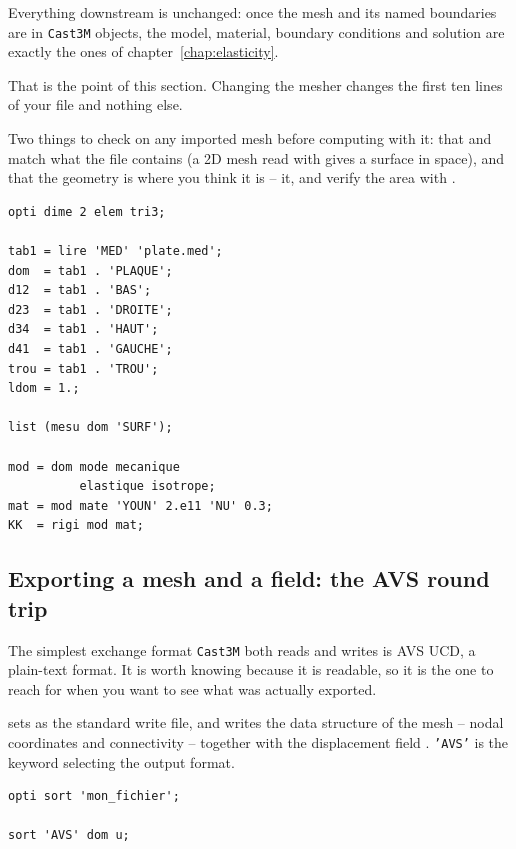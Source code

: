 \begin{castemcom}
Everything downstream is unchanged: once the mesh and its named boundaries
are in \texttt{Cast3M} objects, the model, material, boundary conditions and
solution are exactly the ones of chapter~\ref{chap:elasticity}.

That is the point of this section. Changing the mesher changes the first ten
lines of your file and nothing else.

\medskip
Two things to check on any imported mesh before computing with it: that
 and  match what the file contains (a 2D mesh
read with  gives a surface in space), and that the geometry
is where you think it is --  it, and verify the area with
.
\end{castemcom}
\begin{castemlines}
\begin{verbatim}
opti dime 2 elem tri3;

tab1 = lire 'MED' 'plate.med';
dom  = tab1 . 'PLAQUE';
d12  = tab1 . 'BAS';
d23  = tab1 . 'DROITE';
d34  = tab1 . 'HAUT';
d41  = tab1 . 'GAUCHE';
trou = tab1 . 'TROU';
ldom = 1.;

list (mesu dom 'SURF');

mod = dom mode mecanique
          elastique isotrope;
mat = mod mate 'YOUN' 2.e11 'NU' 0.3;
KK  = rigi mod mat;
\end{verbatim}
\end{castemlines}

\subsection{Exporting a mesh and a field: the AVS round trip}

The simplest exchange format \texttt{Cast3M} both reads and writes is AVS UCD,
a plain-text format. It is worth knowing because it is readable, so it is the
one to reach for when you want to see what was actually exported.

\begin{castemcom}
 sets  as the standard write file, and
 writes the data structure of the mesh  -- nodal
coordinates and connectivity -- together with the displacement field .
\texttt{'AVS'} is the keyword selecting the output format.
\end{castemcom}
\begin{castemlines}
\begin{verbatim}
opti sort 'mon_fichier';

sort 'AVS' dom u;
\end{verbatim}
\end{castemlines}

